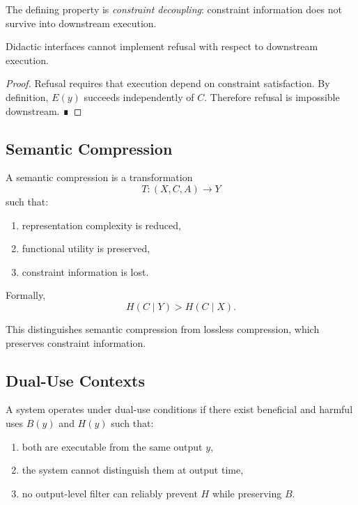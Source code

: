 The defining property is \emph{constraint decoupling}: constraint information does not survive into downstream execution.

\begin{proposition}
Didactic interfaces cannot implement refusal with respect to downstream execution.
\end{proposition}

\begin{proof}
Refusal requires that execution depend on constraint satisfaction. By definition, $E(y)$ succeeds independently of $C$. Therefore refusal is impossible downstream. ∎
\end{proof}

\subsection{Semantic Compression}

\begin{definition}
A semantic compression is a transformation
\[
T : (X,C,A) \to Y
\]
such that:
\begin{enumerate}
\item representation complexity is reduced,
\item functional utility is preserved,
\item constraint information is lost.
\end{enumerate}
Formally,
\[
H(C \mid Y) > H(C \mid X).
\]
\end{definition}

This distinguishes semantic compression from lossless compression, which preserves constraint information.

\subsection{Dual-Use Contexts}

\begin{definition}
A system operates under dual-use conditions if there exist beneficial and harmful uses $B(y)$ and $H(y)$ such that:
\begin{enumerate}
\item both are executable from the same output $y$,
\item the system cannot distinguish them at output time,
\item no output-level filter can reliably prevent $H$ while preserving $B$.
\end{enumerate}
\end{definition}

